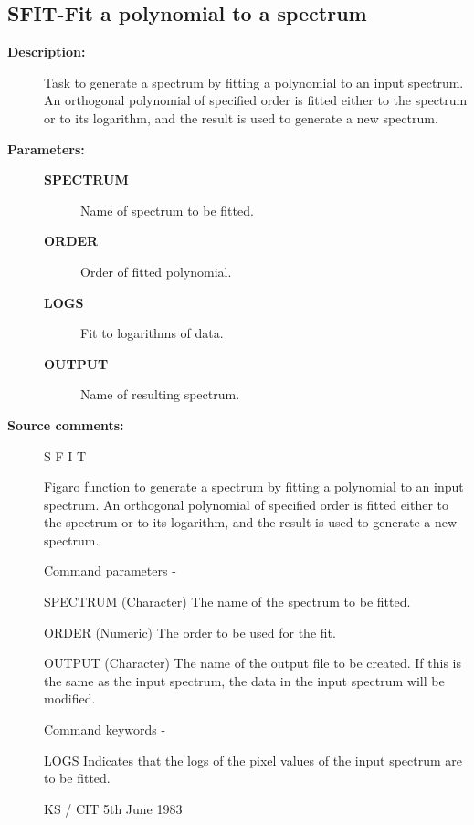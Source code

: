 \subsection{SFIT-\label{SFIT}Fit a polynomial to a spectrum}
\begin{description}

\item [\textbf{Description:}]
 Task to generate a spectrum by fitting a polynomial to
 an input spectrum.  An orthogonal polynomial of specified
 order is fitted either to the spectrum or to its logarithm,
 and the result is used to generate a new spectrum.

\item [\textbf{Parameters:}]
\begin{description}
\item [\textbf{SPECTRUM}]
 Name of spectrum to be fitted.
\item [\textbf{ORDER}]
 Order of fitted polynomial.
\item [\textbf{LOGS}]
 Fit to logarithms of data.
\item [\textbf{OUTPUT}]
 Name of resulting spectrum.
\end{description}

\item [\textbf{Source comments:}]
\begin{terminalv}
 S F I T

 Figaro function to generate a spectrum by fitting a polynomial
 to an input spectrum.  An orthogonal polynomial of specified
 order is fitted either to the spectrum or to its logarithm, and
 the result is used to generate a new spectrum.

 Command parameters -

 SPECTRUM    (Character) The name of the spectrum to be fitted.

 ORDER       (Numeric) The order to be used for the fit.

 OUTPUT      (Character) The name of the output file to
             be created.  If this is the same as the input
             spectrum, the data in the input spectrum will
             be modified.

 Command keywords -

 LOGS        Indicates that the logs of the pixel values
             of the input spectrum are to be fitted.

                                          KS / CIT 5th June 1983
\end{terminalv}
\end{description}
